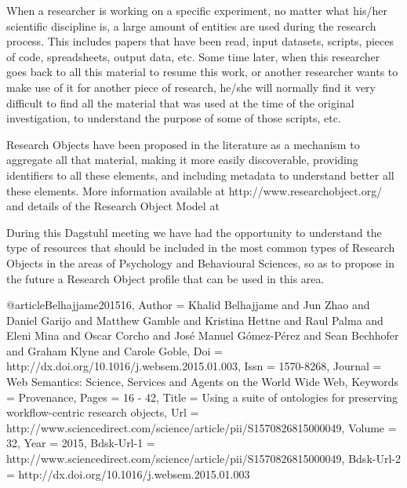 \documentclass[a4paper,UKenglish]{dagrep}
\begin{document}
  




{}
\license
When a researcher is working on a specific experiment, no matter what his/her scientific 
discipline is, a large amount of entities are used during the research process. This includes 
papers that have been read, input datasets, scripts, pieces of code, spreadsheets, output data, 
etc. Some time later, when this researcher goes back to all this material to resume this work, 
or another researcher wants to make use of it for another piece of research, he/she will 
normally find it very difficult to find all the material that was used at the time of the original 
investigation, to understand the purpose of some of those scripts, etc.

Research Objects have been proposed in the literature as a mechanism to aggregate all that 
material, making it more easily discoverable, providing identifiers to all these elements, and 
including metadata to understand better all these elements. More information available at 
http://www.researchobject.org/ and details of the Research Object Model at 
\cite{Belhajjame201516}

During this Dagstuhl meeting we have had the opportunity to understand the type of 
resources that should be included in the most common types of Research Objects in the areas 
of Psychology and Behavioural Sciences, so as to propose in the future a Research Object 
profile that can be used in this area.

\begin{thebibliography}{0}
@article{Belhajjame201516,
	Author = {Khalid Belhajjame and Jun Zhao and Daniel Garijo and Matthew Gamble and 
Kristina Hettne and Raul Palma and Eleni Mina and Oscar Corcho and Jos{\'e} Manuel 
G{\'o}mez-P{\'e}rez and Sean Bechhofer and Graham Klyne and Carole Goble},
	Doi = {http://dx.doi.org/10.1016/j.websem.2015.01.003},
	Issn = {1570-8268},
	Journal = {Web Semantics: Science, Services and Agents on the World Wide Web},
	Keywords = {Provenance},
	Pages = {16 - 42},
	Title = {Using a suite of ontologies for preserving workflow-centric research objects},
	Url = {http://www.sciencedirect.com/science/article/pii/S1570826815000049},
	Volume = {32},
	Year = {2015},
	Bdsk-Url-1 = {http://www.sciencedirect.com/science/article/pii/S1570826815000049},
	Bdsk-Url-2 = {http://dx.doi.org/10.1016/j.websem.2015.01.003}}

\end{thebibliography}
\end{document}
